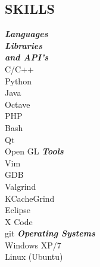 \documentclass[margin]{res}
\begin{document}
\begin{resume}
\section{SKILLS}				\begin{multicols}{3}
									{\sl \textbf{Languages \\ Libraries \\ and API's}} \\
									\linebreak
									C/C++ \\ Python \\ Java \\ Octave \\ PHP \\  
							        Bash \\ Qt \\ Open GL %
									\vfill
									\columnbreak
									{\sl \textbf{Tools}} \\
									\linebreak
									\linebreak
									\linebreak
							 		Vim \\ GDB\\ Valgrind \\ KCacheGrind\\ Eclipse\\ X Code \\ git
									\vfill
									\columnbreak
			                		{\sl \textbf{Operating Systems}} \\ 								
									\linebreak
									\linebreak
									\linebreak
									Windows XP/7 \\ Linux (Ubuntu)
								\end{multicols}


\end{resume}
\end{document}

